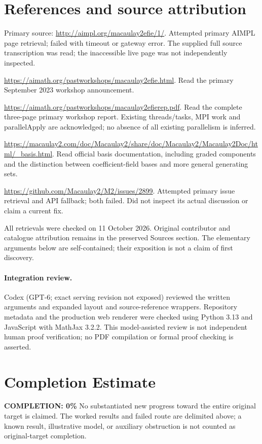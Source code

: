 \documentclass[11pt]{article}
\begin{document}
\section{References and source attribution}
Primary source: \url{http://aimpl.org/macaulay2efie/1/}. Attempted primary AIMPL page retrieval; failed with timeout or gateway error. The supplied full source transcription was read; the inaccessible live page was not independently inspected.

\url{https://aimath.org/pastworkshops/macaulay2efie.html}. Read the primary September 2023 workshop announcement.

\url{https://aimath.org/pastworkshops/macaulay2efierep.pdf}. Read the complete three-page primary workshop report. Existing threads/tasks, MPI work and parallelApply are acknowledged; no absence of all existing parallelism is inferred.

\url{https://macaulay2.com/doc/Macaulay2/share/doc/Macaulay2/Macaulay2Doc/html/_basis.html}. Read official basis documentation, including graded components and the distinction between coefficient-field bases and more general generating sets.

\url{https://github.com/Macaulay2/M2/issues/2899}. Attempted primary issue retrieval and API fallback; both failed. Did not inspect its actual discussion or claim a current fix.

All retrievals were checked on 11 October 2026. Original contributor and catalogue attribution remains in the preserved Sources section. The elementary arguments below are self-contained; their exposition is not a claim of first discovery.


\paragraph{Integration review.} Codex (GPT-6; exact serving revision not exposed) reviewed the written arguments and expanded layout and source-reference wrappers. Repository metadata and the production web renderer were checked using Python 3.13 and JavaScript with MathJax 3.2.2. This model-assisted review is not independent human proof verification; no PDF compilation or formal proof checking is asserted.

\section{Completion Estimate}
\noindent\textbf{COMPLETION: 0\%}
No substantiated new progress toward the entire original target is claimed. The worked results and failed route are delimited above; a known result, illustrative model, or auxiliary obstruction is not counted as original-target completion.
\end{document}
